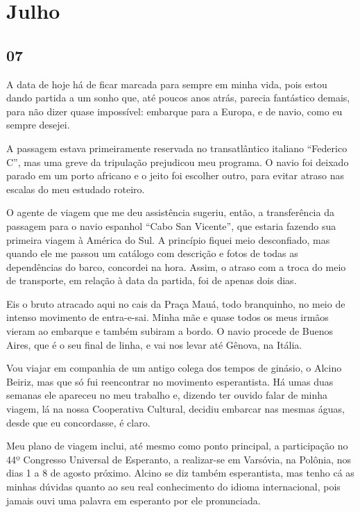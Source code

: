 \chapter{Julho}
\section*{07 \adfflatleafright {}}

A data de hoje há de ficar marcada para sempre em minha vida,  pois estou dando partida a um sonho que, até poucos anos atrás, parecia fantástico demais, para não dizer quase impossível: embarque para a Europa, e de navio, como eu sempre desejei.

A passagem estava primeiramente reservada no transatlântico italiano “Federico C”, mas uma greve da tripulação prejudicou meu programa. O navio foi deixado parado em um porto africano e o jeito foi escolher outro, para evitar atraso nas escalas do meu estudado roteiro.

O agente de viagem que me deu assistência sugeriu, então, a transferência da passagem para o navio espanhol “Cabo San Vicente”, que estaria fazendo sua primeira viagem à América do Sul. A princípio fiquei meio desconfiado, mas quando ele me passou um catálogo com descrição e fotos de todas as dependências do barco, concordei na hora. Assim, o atraso com a troca do meio de transporte, em relação à data da partida, foi de apenas dois dias.

Eis o bruto atracado aqui no cais da Praça Mauá, todo branquinho, no meio de intenso movimento de entra-e-sai. Minha mãe e quase todos os meus irmãos vieram ao embarque e também subiram a bordo. O navio procede de Buenos Aires, que é o seu final de linha, e vai nos levar até Gênova, na Itália.

Vou viajar em companhia de um antigo colega dos tempos de ginásio, o Alcino Beiriz, mas que só fui reencontrar no movimento esperantista. Há umas duas semanas ele apareceu no meu trabalho e, dizendo ter ouvido falar de minha viagem, lá na nossa Cooperativa Cultural, decidiu embarcar nas mesmas águas, desde que eu concordasse, é claro.

Meu plano de viagem inclui, até mesmo como ponto principal, a participação no 44º Congresso Universal de Esperanto, a realizar-se em Varsóvia, na Polônia, nos dias 1 a 8 de agosto próximo. Alcino se diz também esperantista, mas tenho cá as minhas dúvidas quanto ao seu real conhecimento do idioma internacional, pois jamais ouvi uma palavra em esperanto por ele pronunciada.

